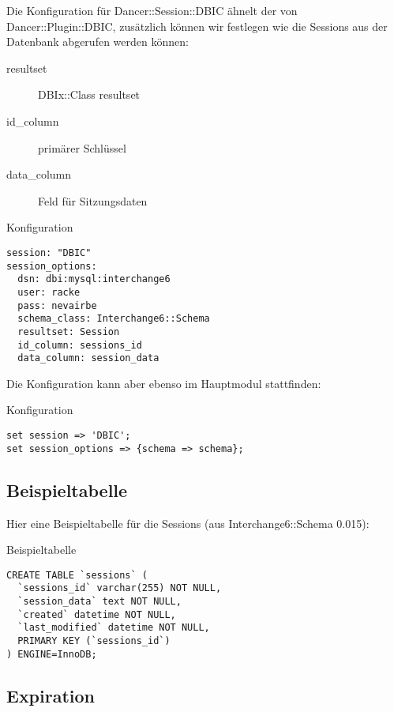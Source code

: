 Die Konfiguration für Dancer::Session::DBIC ähnelt der von
Dancer::Plugin::DBIC, zusätzlich können wir festlegen wie
die Sessions aus der Datenbank abgerufen werden können:

\begin{description}
\item[resultset] DBIx::Class resultset
\item[id\_column] primärer Schlüssel
\item[data\_column] Feld für Sitzungsdaten 
\end{description}

\begin{frame}[fragile]{Konfiguration}
\begin{lstlisting}
session: "DBIC"
session_options:
  dsn: dbi:mysql:interchange6
  user: racke
  pass: nevairbe
  schema_class: Interchange6::Schema
  resultset: Session
  id_column: sessions_id
  data_column: session_data
\end{lstlisting}
\end{frame}

Die Konfiguration kann aber ebenso im Hauptmodul
stattfinden:

\begin{frame}[fragile]{Konfiguration}
\begin{lstlisting}
set session => 'DBIC';
set session_options => {schema => schema};
\end{lstlisting}
\end{frame}

\subsection{Beispieltabelle}

Hier eine Beispieltabelle für die Sessions (aus
Interchange6::Schema 0.015):

\begin{frame}[fragile]{Beispieltabelle}
\begin{lstlisting}
CREATE TABLE `sessions` (
  `sessions_id` varchar(255) NOT NULL,
  `session_data` text NOT NULL,
  `created` datetime NOT NULL,
  `last_modified` datetime NOT NULL,
  PRIMARY KEY (`sessions_id`)
) ENGINE=InnoDB;
\end{lstlisting}
\end{frame}

\subsection{Expiration}

